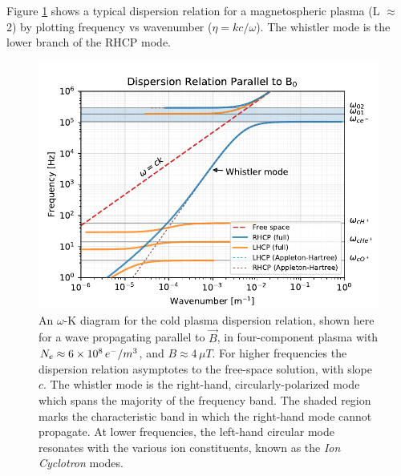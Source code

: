 Figure \ref{fig:whistler_mode_dispersion} shows a typical dispersion relation for a magnetospheric plasma (L $\approx$ 2) by plotting frequency vs wavenumber ($\eta = k c/\omega$). The whistler mode is the lower branch of the RHCP mode.
\begin{figure}[!ht]
\begin{center}
\includegraphics{figures/omega-k_diagram_parallel}
\caption[An $\omega$-K diagram for the cold, four-component dispersion relation, for parallel propagation at L$\approx$3]{An $\omega$-K diagram for the cold plasma dispersion relation, shown here for a wave propagating parallel to $\vec{B}$, in four-component plasma with $N_e \approx  6\times 10^{8}\,e^-/m^3$, and $B\approx 4\,\mu T$. For higher frequencies the dispersion relation asymptotes to the free-space solution, with slope $c$. The whistler mode is the right-hand, circularly-polarized mode which spans the majority of the frequency band. The shaded region marks the characteristic band in which the right-hand mode cannot propagate. At lower frequencies, the left-hand circular mode resonates with the various ion constituents,  known as the \emph{Ion Cyclotron} modes.}
\label{fig:whistler_mode_dispersion}
\end{center}
\end{figure}